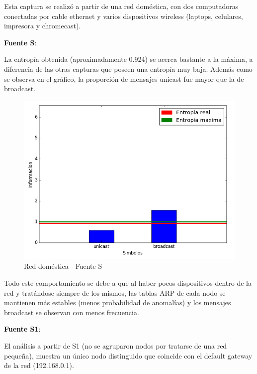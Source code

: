 Esta captura se realizó a partir de una red doméstica, con dos computadoras conectadas por cable ethernet y varios dispositivos wireless (laptops, celulares, impresora y chromecast).

\textbf{Fuente S}:

La entropía obtenida (aproximadamente 0.924) se acerca bastante a la máxima, a diferencia de las otras capturas que poseen una entropía muy baja. Además como se observa en el gráfico, la proporción de mensajes unicast fue mayor que la de broadcast.	

\begin{figure}[H]
\centering
\includegraphics[keepaspectratio=true,scale=1,width=1\linewidth]{imagenes/red-dom-S}
\caption{Red doméstica - Fuente S}
\label{fig:red-dom-S}
\end{figure}

Todo este comportamiento se debe a que al haber pocos dispositivos dentro de la red y tratándose siempre de los mismos, las tablas ARP de cada nodo se mantienen más estables (menos probabilidad de anomalías) y los mensajes broadcast se observan con menos frecuencia.

\textbf{Fuente S1}:

El análisis a partir de S1 (no se agruparon nodos por tratarse de una red pequeña), muestra un único nodo distinguido que coincide con el default gateway de la red (192.168.0.1).

